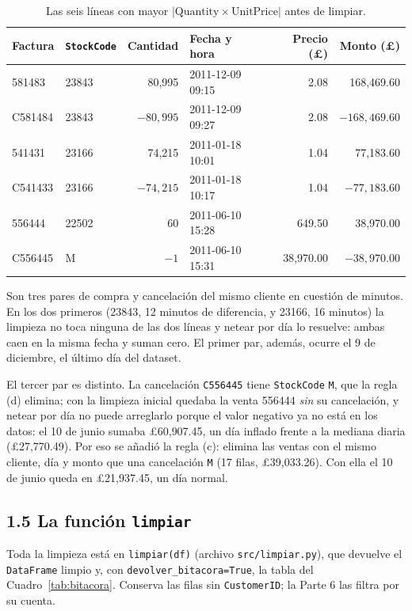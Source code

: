 \documentclass[11pt]{article}
\begin{document}
\begin{table}[H]
\centering
\small
\begin{tabular}{l|l|r|l|r|r}
\hline
Factura & \texttt{StockCode} & Cantidad & Fecha y hora & Precio (\pounds) & Monto (\pounds) \\
\hline
581483  & 23843 &  80{,}995 & 2011-12-09 09:15 &  2.08 &  168{,}469.60 \\
C581484 & 23843 & $-80{,}995$ & 2011-12-09 09:27 & 2.08 & $-168{,}469.60$ \\
541431  & 23166 &  74{,}215 & 2011-01-18 10:01 &  1.04 &  77{,}183.60 \\
C541433 & 23166 & $-74{,}215$ & 2011-01-18 10:17 & 1.04 & $-77{,}183.60$ \\
556444  & 22502 &        60 & 2011-06-10 15:28 & 649.50 &  38{,}970.00 \\
C556445 & M     &      $-1$ & 2011-06-10 15:31 & 38{,}970.00 & $-38{,}970.00$ \\
\hline
\end{tabular}
\caption{Las seis l\'ineas con mayor $|\text{Quantity}\times\text{UnitPrice}|$
antes de limpiar.}
\label{tab:top6}
\end{table}

Son tres pares de compra y cancelaci\'on del mismo cliente en cuesti\'on de
minutos. En los dos primeros (23843, 12 minutos de diferencia, y 23166, 16
minutos) la limpieza no toca ninguna de las dos l\'ineas y netear por d\'ia lo
resuelve: ambas caen en la misma fecha y suman cero. El primer par, adem\'as,
ocurre el 9 de diciembre, el \'ultimo d\'ia del dataset.

El tercer par es distinto. La cancelaci\'on \texttt{C556445} tiene
\texttt{StockCode} \texttt{M}, que la regla (d) elimina; con la limpieza
inicial quedaba la venta 556444 \emph{sin} su cancelaci\'on, y netear por d\'ia
no puede arreglarlo porque el valor negativo ya no est\'a en los datos: el 10
de junio sumaba \pounds 60{,}907.45, un d\'ia inflado frente a la mediana
diaria (\pounds 27{,}770.49). Por eso se a\~nadi\'o la regla (c): elimina las
ventas con el mismo cliente, d\'ia y monto que una cancelaci\'on \texttt{M}
(17 filas, \pounds 39{,}033.26). Con ella el 10 de junio queda en
\pounds 21{,}937.45, un d\'ia normal.

\subsection*{1.5 La funci\'on \texttt{limpiar}}

Toda la limpieza est\'a en \texttt{limpiar(df)} (archivo
\texttt{src/limpiar.py}), que devuelve el \texttt{DataFrame} limpio y, con
\texttt{devolver\_bitacora=True}, la tabla del Cuadro~\ref{tab:bitacora}.
Conserva las filas sin \texttt{CustomerID}; la Parte 6 las filtra por su
cuenta.
\end{document}
